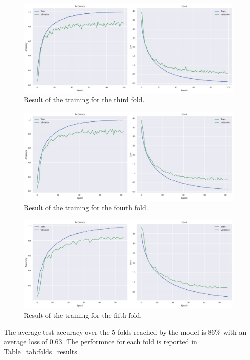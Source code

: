 \documentclass{article}
\begin{document}
\begin{sloppy}
\begin{figure}[ht]
  \centering
  \centerline{\includegraphics[width=\columnwidth]{fold2.png}}
  \caption{Result of the training for the third fold.}
  \label{fig:fold2}
\end{figure}

\begin{figure}[ht]
  \centering
  \centerline{\includegraphics[width=\columnwidth]{fold3.png}}
  \caption{Result of the training for the fourth fold.}
  \label{fig:fold3}
\end{figure}

\begin{figure}[ht]
  \centering
  \centerline{\includegraphics[width=\columnwidth]{fold4.png}}
  \caption{Result of the training for the fifth fold.}
  \label{fig:fold4}
\end{figure}

The average test accuracy over the 5 folds reached by the model is 86\% with an average loss of 0.63.
The performnce for each fold is reported in Table~\ref{tab:folds_results}.


\end{sloppy}
\end{document}
